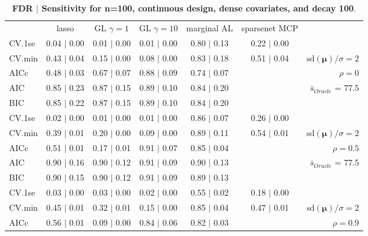 \clearpage
\begin{table}\vspace{-.5cm}
\caption[l]{ {\it }
{ \bf FDR $\boldsymbol{\mid}$ Sensitivity for n=100, continuous design, dense covariates, and  decay  100}.}
\vspace{-.5cm}
\footnotesize{}
\begin{center}
\begin{tabular}{l*{5}{c}|r}
 & lasso & GL $\gamma=1$ & GL $\gamma=10$ & marginal AL & sparsenet MCP  & \\
 \cline{1-7}
CV.1se & 0.04 $\mid$ 0.00 & 0.01 $\mid$ 0.00 & 0.01 $\mid$ 0.00 & 0.80 $\mid$ 0.13 & 0.22 $\mid$ 0.00 & \\
CV.min & 0.43 $\mid$ 0.04 & 0.15 $\mid$ 0.00 & 0.08 $\mid$ 0.00 & 0.83 $\mid$ 0.18 & 0.51 $\mid$ 0.04 &  $\mathrm{sd}(\mathbf{\mu})/\sigma=2$ \\
AICc & 0.48 $\mid$ 0.03 & 0.67 $\mid$ 0.07 & 0.88 $\mid$ 0.09 & 0.74 $\mid$ 0.07 & & $\rho=0$ \\
AIC & 0.85 $\mid$ 0.23 & 0.87 $\mid$ 0.15 & 0.89 $\mid$ 0.10 & 0.84 $\mid$ 0.20 & &  \multirow{2}{*}{$\bar{s}_{Oracle}$ = 77.5} \\
BIC & 0.85 $\mid$ 0.22 & 0.87 $\mid$ 0.15 & 0.89 $\mid$ 0.10 & 0.84 $\mid$ 0.20 & &  \\
 \hline 
CV.1se & 0.02 $\mid$ 0.00 & 0.01 $\mid$ 0.00 & 0.01 $\mid$ 0.00 & 0.86 $\mid$ 0.07 & 0.26 $\mid$ 0.00 & \\
CV.min & 0.39 $\mid$ 0.01 & 0.20 $\mid$ 0.00 & 0.09 $\mid$ 0.00 & 0.89 $\mid$ 0.11 & 0.54 $\mid$ 0.01 &  $\mathrm{sd}(\mathbf{\mu})/\sigma=2$ \\
AICc & 0.51 $\mid$ 0.01 & 0.17 $\mid$ 0.01 & 0.91 $\mid$ 0.07 & 0.85 $\mid$ 0.04 & & $\rho=0.5$ \\
AIC & 0.90 $\mid$ 0.16 & 0.90 $\mid$ 0.12 & 0.91 $\mid$ 0.09 & 0.90 $\mid$ 0.13 & &  \multirow{2}{*}{$\bar{s}_{Oracle}$ = 77.5} \\
BIC & 0.90 $\mid$ 0.15 & 0.90 $\mid$ 0.12 & 0.91 $\mid$ 0.09 & 0.89 $\mid$ 0.13 & &  \\
 \hline 
CV.1se & 0.03 $\mid$ 0.00 & 0.03 $\mid$ 0.00 & 0.02 $\mid$ 0.00 & 0.55 $\mid$ 0.02 & 0.18 $\mid$ 0.00 & \\
CV.min & 0.45 $\mid$ 0.01 & 0.32 $\mid$ 0.01 & 0.15 $\mid$ 0.00 & 0.85 $\mid$ 0.04 & 0.47 $\mid$ 0.01 &  $\mathrm{sd}(\mathbf{\mu})/\sigma=2$ \\
AICc & 0.56 $\mid$ 0.01 & 0.09 $\mid$ 0.00 & 0.84 $\mid$ 0.06 & 0.82 $\mid$ 0.03 & & $\rho=0.9$ \\

\end{tabular}
\end{center}
\end{table}
